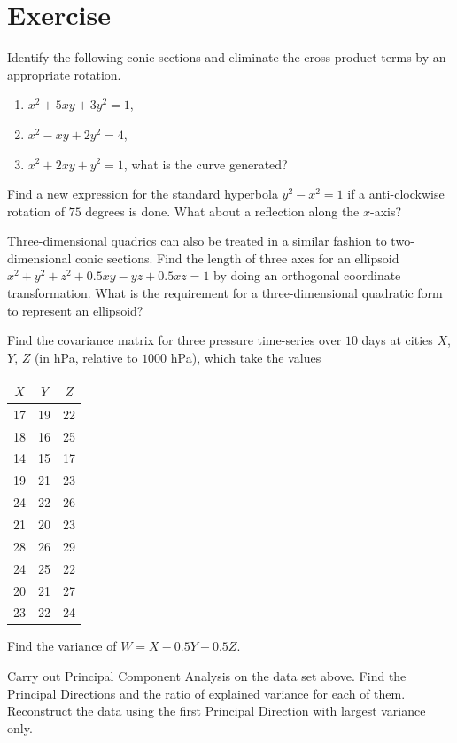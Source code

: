 \section{Exercise}

\begin{Exercise}
Identify the following conic sections and eliminate the cross-product terms by an appropriate rotation.
\begin{enumerate}[label=(\alph*)]
\item $x^2 + 5xy + 3y^2 = 1$,
\item $x^2 - xy + 2y^2 = 4$,
\item $x^2 + 2xy + y^2 = 1$, what is the curve generated? 
\end{enumerate}
\end{Exercise}

\begin{Exercise}
Find a new expression for the standard hyperbola $y^2 - x^2 = 1$ if a anti-clockwise rotation of $75$ degrees is done. What about a reflection along the $x$-axis?
\end{Exercise}

\begin{Exercise}
Three-dimensional quadrics can also be treated in a similar fashion to two-dimensional conic sections. Find the length of three axes for an ellipsoid $x^2 + y^2 + z^2 + 0.5xy - yz + 0.5xz = 1$ by doing an orthogonal coordinate transformation. What is the requirement for a three-dimensional quadratic form to represent an ellipsoid?
\end{Exercise}

\begin{Exercise}
Find the covariance matrix for three pressure time-series over $10$ days at cities $X$, $Y$, $Z$ (in hPa, relative to $1000$ hPa), which take the values
\begin{center}
\begin{tabular}{|c|c|c|}
\hline
$X$ & $Y$ & $Z$ \\
\hline
17 & 19 & 22 \\
\hline
18 & 16 & 25 \\
\hline
14 & 15 & 17 \\
\hline
19 & 21 & 23 \\
\hline
24 & 22 & 26 \\
\hline
21 & 20 & 23 \\
\hline 
28 & 26 & 29 \\
\hline
24 & 25 & 22 \\
\hline
20 & 21 & 27 \\
\hline
23 & 22 & 24 \\
\hline
\end{tabular}
\end{center}
Find the variance of $W = X - 0.5Y - 0.5Z$.
\end{Exercise}

\begin{Exercise}
Carry out Principal Component Analysis on the data set above. Find the Principal Directions and the ratio of explained variance for each of them. Reconstruct the data using the first Principal Direction with largest variance only.
\end{Exercise}

